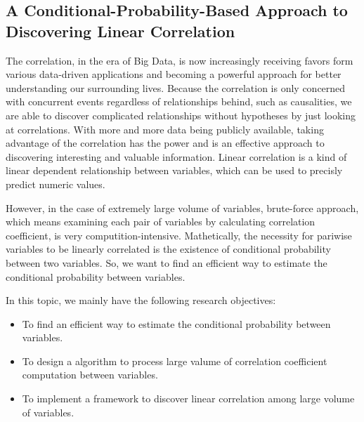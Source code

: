 \subsection{A Conditional-Probability-Based Approach to Discovering Linear Correlation}

The correlation, in the era of Big Data, is now increasingly receiving favors form various data-driven applications and becoming a powerful approach for better understanding our surrounding lives. Because the correlation is only concerned with concurrent events regardless of relationships behind, such as causalities, we are able to discover complicated relationships without hypotheses by just looking at correlations. With more and more data being publicly available, taking advantage of the correlation has the power and is an effective approach to discovering interesting and valuable information. Linear correlation
is a kind of linear dependent relationship between variables, which can be used to precisly predict numeric values.

However, in the case of extremely large volume of variables, brute-force approach, which means examining each pair of variables by calculating correlation coefficient, is very computition-intensive. Mathetically, the necessity for pariwise variables to be linearly correlated is the existence of conditional probability between two variables.
So, we want to find an efficient way to estimate the conditional probability between variables.

In this topic, we mainly have the following research objectives:

\begin{itemize}
  \item To find an efficient way to estimate the conditional probability between variables.
  \item To design a algorithm to process large valume of correlation coefficient computation between variables.
  \item To implement a framework to discover linear correlation among large volume of variables.
\end{itemize}
